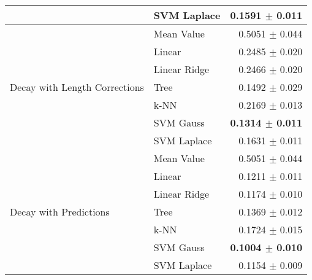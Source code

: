 \documentclass[10pt]{article}
\begin{document}
\begin{table}[H]
\begin{tabular}{llr}
                               & SVM Laplace  & 0.1591 $\pm$ 0.011 \\
    \hline
    \multirow{7}{*}{Decay with Length Corrections} & Mean Value   & 0.5051 $\pm$ 0.044 \\
                               & Linear       & 0.2485 $\pm$ 0.020 \\
                               & Linear Ridge & 0.2466 $\pm$ 0.020 \\
                               & Tree         & 0.1492 $\pm$ 0.029 \\
                               & k-NN         & 0.2169 $\pm$ 0.013 \\
                               & SVM Gauss    & \textbf{0.1314 $\pm$ 0.011} \\
                               & SVM Laplace  & 0.1631 $\pm$ 0.011 \\
    \hline
    \multirow{7}{*}{Decay with Predictions} & Mean Value   & 0.5051 $\pm$ 0.044 \\
                               & Linear       & 0.1211 $\pm$ 0.011 \\
                               & Linear Ridge & 0.1174 $\pm$ 0.010 \\
                               & Tree         & 0.1369 $\pm$ 0.012 \\
                               & k-NN         & 0.1724 $\pm$ 0.015 \\
                               & SVM Gauss    & \textbf{0.1004 $\pm$ 0.010} \\
                               & SVM Laplace  & 0.1154 $\pm$ 0.009 \\
    \hline\hline
  \end{tabular}
  \label{tab:gapresults}
\end{table}





\end{document}
